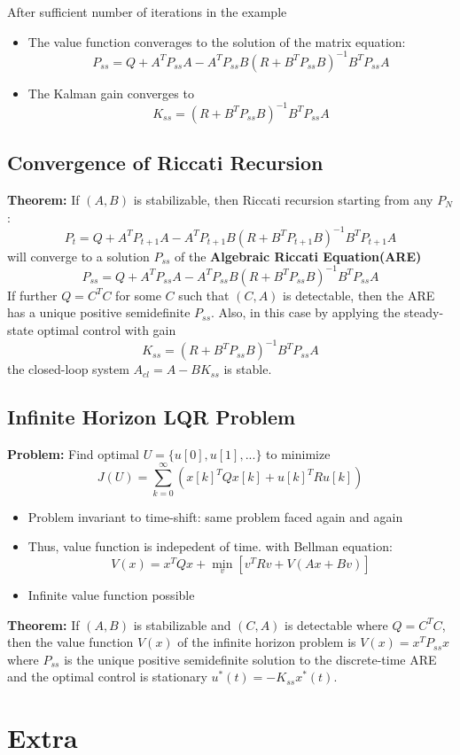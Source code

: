 \documentclass[10pt,a4paper,oneside]{article}
\begin{document}
\noindent After sufficient number of iterations in the example
\begin{itemize}
	\item The value function converages to the solution of the matrix equation:
	\[
	P_{ss}=Q+A^TP_{ss}A - A^TP_{ss}B(R+B^TP_{ss}B)^{-1}B^TP_{ss}A
	\]
	\item The Kalman gain converges to
	\[
	K_{ss} =(R+B^TP_{ss}B)^{-1}B^TP_{ss}A
	\]
\end{itemize}
\subsection{Convergence of Riccati Recursion}
{\bfseries Theorem: }If $(A,B)$ is stabilizable, then Riccati recursion starting from any $P_N$:
\[
P_t=Q+A^TP_{t+1}A - A^TP_{t+1}B(R+B^TP_{t+1}B)^{-1}B^TP_{t+1}A
\]
will converge to a solution $P_{ss}$ of the {\bfseries Algebraic Riccati Equation(ARE)}
\[
P_{ss}=Q+A^TP_{ss}A - A^TP_{ss}B(R+B^TP_{ss}B)^{-1}B^TP_{ss}A
\]
If further $Q=C^TC$ for some $C$ such that $(C,A)$ is detectable, then the ARE has a unique positive semidefinite $P_{ss}$. Also, in this case by applying the steady-state optimal control with gain
\[
K_{ss}=(R+B^TP_{ss}B)^{-1}B^TP_{ss}A
\]
the closed-loop system $A_{cl}=A-BK_{ss}$ is stable.
\subsection{Infinite Horizon LQR Problem}
{\bfseries Problem: }Find optimal $U=\{u[0],u[1],...\}$ to minimize
$$
J(U)=\sum_{k=0}^{\infty}\left(x[k]^{T} Q x[k]+u[k]^{T} R u[k]\right)
$$
\begin{itemize}
	\item Problem invariant to time-shift: same problem faced again and again
	\item Thus, value function is indepedent of time. with Bellman equation:
	$$
	V(x)=x^{T} Q x+\min _{v}\left[v^{T} R v+V(A x+B v)\right]
	$$
	\item Infinite value function possible
\end{itemize}
{\bfseries Theorem: }If $(A,B)$ is stabilizable and $(C,A)$ is detectable where $Q=C^TC$, then the value function $V(x)$ of the infinite horizon problem is $V(x)=x^TP_{ss}x$ where $P_{ss}$ is the unique positive semidefinite solution to the discrete-time ARE and the optimal control is stationary $u^*(t)=-K_{ss}x^*(t)$.



\section{Extra}
\end{document}
